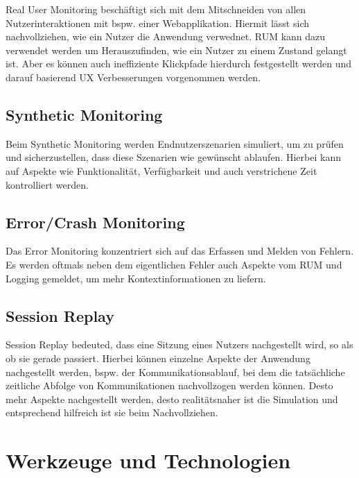 Real User Monitoring beschäftigt sich mit dem Mitschneiden von allen Nutzerinteraktionen mit bspw. einer Webapplikation. Hiermit lässt sich nachvollziehen, wie ein Nutzer die Anwendung verwednet. RUM kann dazu verwendet werden um Herauszufinden, wie ein Nutzer zu einem Zustand gelangt ist. Aber es können auch ineffiziente Klickpfade hierdurch festgestellt werden und darauf basierend UX Verbesserungen vorgenommen werden.

\subsection{Synthetic Monitoring}

Beim Synthetic Monitoring werden Endnutzerszenarien simuliert, um zu prüfen und sicherzustellen, dass diese Szenarien wie gewünscht ablaufen. Hierbei kann auf Aspekte wie Funktionalität, Verfügbarkeit und auch verstrichene Zeit kontrolliert werden.

\subsection{Error/Crash Monitoring}

Das Error Monitoring konzentriert sich auf das Erfassen und Melden von Fehlern. Es werden oftmals neben dem eigentlichen Fehler auch Aspekte vom RUM und Logging gemeldet, um mehr Kontextinformationen zu liefern.

\subsection{Session Replay}

Session Replay bedeuted, dass eine Sitzung eines Nutzers nachgestellt wird, so als ob sie gerade passiert. Hierbei können einzelne Aspekte der Anwendung nachgestellt werden, bspw. der Kommunikationsablauf, bei dem die tatsächliche zeitliche Abfolge von Kommunikationen nachvollzogen werden können. Desto mehr Aspekte nachgestellt werden, desto realitätsnaher ist die Simulation und entsprechend hilfreich ist sie beim Nachvollziehen.

\newpage

\section{Werkzeuge und Technologien}

%
%

